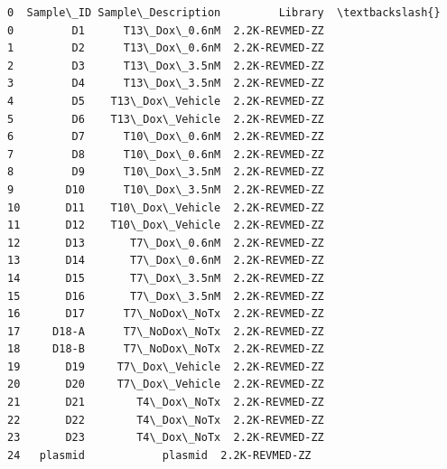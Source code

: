 \documentclass[11pt]{article}
\begin{document}
    
    \begin{Verbatim}[commandchars=\\\{\}]
0  Sample\_ID Sample\_Description         Library  \textbackslash{}
0         D1      T13\_Dox\_0.6nM  2.2K-REVMED-ZZ   
1         D2      T13\_Dox\_0.6nM  2.2K-REVMED-ZZ   
2         D3      T13\_Dox\_3.5nM  2.2K-REVMED-ZZ   
3         D4      T13\_Dox\_3.5nM  2.2K-REVMED-ZZ   
4         D5    T13\_Dox\_Vehicle  2.2K-REVMED-ZZ   
5         D6    T13\_Dox\_Vehicle  2.2K-REVMED-ZZ   
6         D7      T10\_Dox\_0.6nM  2.2K-REVMED-ZZ   
7         D8      T10\_Dox\_0.6nM  2.2K-REVMED-ZZ   
8         D9      T10\_Dox\_3.5nM  2.2K-REVMED-ZZ   
9        D10      T10\_Dox\_3.5nM  2.2K-REVMED-ZZ   
10       D11    T10\_Dox\_Vehicle  2.2K-REVMED-ZZ   
11       D12    T10\_Dox\_Vehicle  2.2K-REVMED-ZZ   
12       D13       T7\_Dox\_0.6nM  2.2K-REVMED-ZZ   
13       D14       T7\_Dox\_0.6nM  2.2K-REVMED-ZZ   
14       D15       T7\_Dox\_3.5nM  2.2K-REVMED-ZZ   
15       D16       T7\_Dox\_3.5nM  2.2K-REVMED-ZZ   
16       D17      T7\_NoDox\_NoTx  2.2K-REVMED-ZZ   
17     D18-A      T7\_NoDox\_NoTx  2.2K-REVMED-ZZ   
18     D18-B      T7\_NoDox\_NoTx  2.2K-REVMED-ZZ   
19       D19     T7\_Dox\_Vehicle  2.2K-REVMED-ZZ   
20       D20     T7\_Dox\_Vehicle  2.2K-REVMED-ZZ   
21       D21        T4\_Dox\_NoTx  2.2K-REVMED-ZZ   
22       D22        T4\_Dox\_NoTx  2.2K-REVMED-ZZ   
23       D23        T4\_Dox\_NoTx  2.2K-REVMED-ZZ   
24   plasmid            plasmid  2.2K-REVMED-ZZ   


\end{Verbatim}
\end{document}
